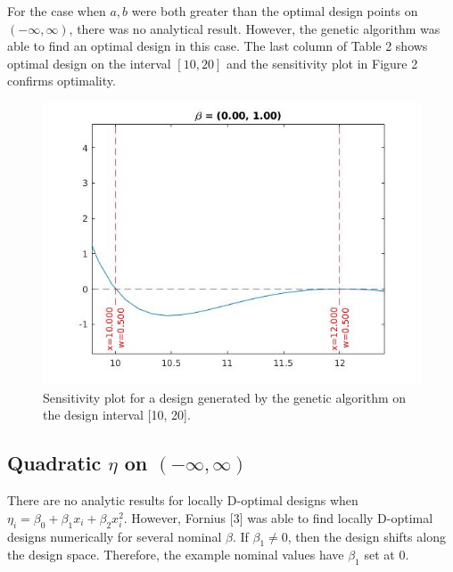 \documentclass[11pt,a4paper]{article}
\begin{document}
For the case when $a,b$ were both greater than the optimal design points on $(-\infty, \infty)$, there was no analytical result. However, the genetic algorithm was able to find an optimal design in this case. The last column of Table 2 shows optimal design on the interval $[10,20]$ and the sensitivity plot in Figure 2 confirms optimality.

\begin{figure}
\centering
\includegraphics[scale=0.5]{figures/fig2.jpg}
\caption{Sensitivity plot for a design generated by the genetic algorithm on the design interval [10, 20].}
\end{figure}

\subsection{Quadratic $\eta$ on $(-\infty, \infty)$}
There are no analytic results for locally D-optimal designs when $\eta_i = \beta_0 + \beta_1 x_i + \beta_2 x_i^2$. However, Fornius [3] was able to find locally D-optimal designs numerically for several nominal $\beta$. If $\beta_1 \neq 0$, then the design shifts along the design space. Therefore, the example nominal values have $\beta_1$ set at 0.
\end{document}
